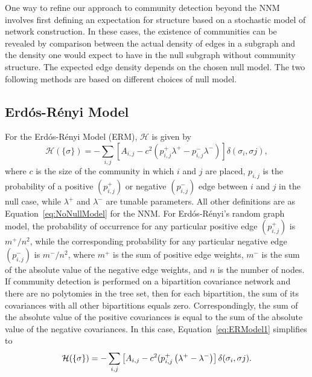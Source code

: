 \documentclass[11pt]{article}
\begin{document}
One way to refine our approach to community detection beyond the NNM involves first
defining an expectation for structure based on a stochastic model of network construction. In
these cases, the existence of communities can be revealed by comparison between the actual
density of edges in a subgraph and the density one would expect to have in the null subgraph
without community structure. The expected edge density depends on the chosen null model.
The two following methods are based on different choices of null model. \\


\subsection{Erd\'{o}s-R\'{e}nyi Model}\label{appendix:ERModel}

For the Erd\'{o}s-R\'{e}nyi Model (ERM), $\mathcal{H}$ is given by
\begin{equation}\label{eq:ERModel1}
\mathcal{H}(\{\sigma\}) = - \displaystyle\sum_{i,j} \left[A_{i,j} -c^{2}\left(p_{i,j}^{+}\lambda^{+} - p_{i,j}^{-}\lambda^{-}\right)\right]\delta(\sigma_{i}, \sigma{j}),
\end{equation}
where $c$ is the size of the community in which $i$ and $j$ are placed, $p_{i,j}$ is the probability of a positive $(p_{i,j}^{+})$ or negative $(p_{i,j}^{-})$ edge between $i$ and $j$ in the null case, while $\lambda^{+}$ and $\lambda^{-}$ are tunable parameters. All other definitions are as Equation~\eqref{eq:NoNullModel} for the NNM. For Erd\'{o}s-R\'{e}nyi's random graph model, the probability of occurrence for any particular positive edge $(p_{i,j}^{+})$ is $m^{+} / n^{2}$, while the corresponding probability for any particular negative edge $(p_{i,j}^{-})$ is $m^{-} / n^{2}$, where $m^{+}$ is the sum of positive edge weights, $m^{-}$ is the sum of the absolute value of the negative edge weights, and $n$ is the number of nodes.\\


If community detection is performed on a bipartition covariance network and there are no
polytomies in the tree set, then for each bipartition, the sum of its covariances with all other
bipartitions equals zero. Correspondingly, the sum of the absolute value of the positive
covariances is equal to the sum of the absolute value of the negative covariances. In this case, Equation~\eqref{eq:ERModel1} simplifies to
\begin{equation}\label{eq:ERModel2}
\mathcal{H}(\{\sigma\}) = - \displaystyle\sum_{i,j} \left[A_{i,j} -c^{2}(p_{i,j}^{+}\left(\lambda^{+} - \lambda^{-}\right)\right]\delta(\sigma_{i}, \sigma{j}). \\
\end{equation}
\end{document}
